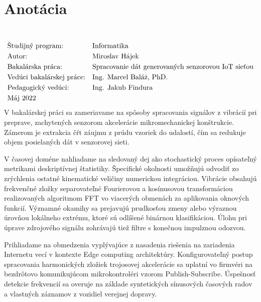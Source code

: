 \thispagestyle{empty}
\section*{Anotácia}
\University \\
\uppercase{\Faculty}
\vspace{-8pt}
{\setlength{\mathindent}{0cm}
\begin{align*}
&\text{Študijný program:} && \text{\StudyProgramme} \\
&\text{Autor:} && \text{\Author} \\
&\text{\Thesis:} && \text{\Title} \\
&\text{Vedúci bakalárskej práce:} && \text{\Supervisor} \\
&\text{Pedagogický vedúci:} && \text{\PedagogicalSupervisor} \\
&\text{\Date}
\end{align*}}
V bakalárskej práci sa zameriavame na spôsoby spracovania signálov z vibrácií pri preprave, zachytených
senzorom akcelerácie mikromechanickej konštrukcie. Zámerom je extrakcia čŕt záujmu z prúdu vzoriek do udalostí, 
čím sa redukuje objem posielaných dát v senzorovej sieti.

V časovej doméne nahliadame na sledovaný dej ako stochastický proces opísateľný metrikami deskriptívnej štatistiky.
Špecifické okolnosti umožňujú odvodiť zo zrýchlenia ostatné kinematické veličiny numerickou integráciou.
Vibrácie obsahujú frekvenčné zložky separovateľné Fourierovou a kosínusovou transformáciou 
realizovaných algoritmom FFT vo viacerých obmenách za aplikovania oknových funkcií. 
Významné okamihy sa prejavujú prudkosťou zmeny alebo výraznou úrovňou lokálneho extrému, ktoré sú odlíšené binárnou
klasifikáciou. Úlohu pri úprave zdrojového signálu zohrávajú tiež filtre s konečnou impulznou odozvou. 

Prihliadame na obmedzenia vyplývajúce z nasadenia riešenia na zariadenia
Internetu vecí v kontexte Edge computing architektúry. Konfigurovateľný postup spracovania harmonických zložiek 
trojosovej akcelerácie sa uplatní vo firmvéri na bezdrôtovo komunikujúcom mikrokontroléri vzorom Publish-Subscribe.
Úspešnosť detekcie frekvencií sa overuje na základe syntetických sínusových časových radov a vlastných záznamov
z vozidiel verejnej dopravy.
\emptypage

\thispagestyle{empty}
